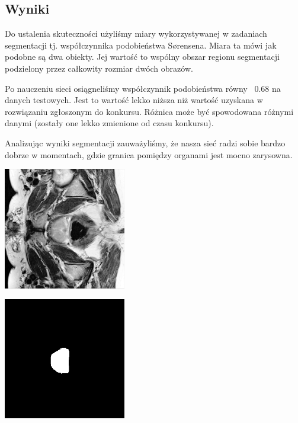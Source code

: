 \documentclass[a4paper,11pt,twoside]{report}
\theoremstyle{definition}
\begin{document}
\subsection{Wyniki}

Do ustalenia skuteczności użyliśmy miary wykorzystywanej w zadaniach segmentacji tj. współczynnika podobieństwa Sørensena. Miara ta mówi jak podobne są dwa obiekty. Jej wartość to wspólny obszar regionu segmentacji podzielony przez całkowity rozmiar dwóch obrazów.

Po nauczeniu sieci osiągneliśmy współczynnik podobieństwa równy ~0.68 na danych testowych. Jest to wartość lekko niższa niż wartość uzyskana w rozwiązaniu zgłoszonym do konkursu. Różnica może być spowodowana różnymi danymi (zostały one lekko zmienione od czasu konkursu). 

\par

Analizując wyniki segmentacji zauważyliśmy, że nasza sieć radzi sobie bardzo dobrze w momentach, gdzie granica pomiędzy organami jest mocno zarysowna.

\begin{minipage}{\linewidth}
	\centering
	\includegraphics[width=0.4\textwidth]{segmentation/segmentation_train_1.png}
\end{minipage}

\begin{minipage}{\linewidth}
	\centering
	\includegraphics[width=0.4\textwidth]{segmentation/segmentaion_mask_1.png}
\end{minipage}
\end{document}
